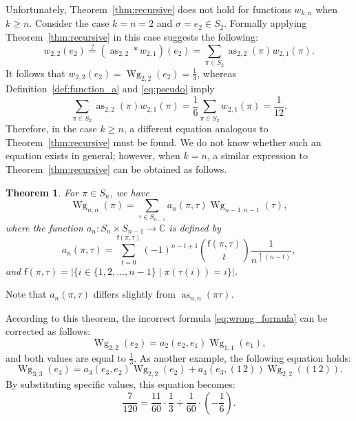 \documentclass[10pt,a4paper]{amsart}
\numberwithin{equation}{section}
\newtheorem{Theorem}{Theorem}[section]
\theoremstyle{definition}
\newcommand{\fix}[1]{\mathsf{f}(#1)}
\DeclareMathOperator{\Raise}{as}
\DeclareMathOperator{\Wg}{Wg}
\begin{document}
Unfortunately, Theorem~\ref{thm:recursive} does not hold for functions $w_{k,n}$ when $k \ge n$.
Consider the case $k=n=2$ and $\sigma =e_2 \in S_2$.
Formally applying Theorem~\ref{thm:recursive} in this case suggests the following:
\begin{equation} \label{eq:wrong_formula}
w_{2,2}(e_2) \stackrel{?}{=} (\Raise_{2,2} * w_{2,1})(e_2) = \sum_{\pi \in S_2} \Raise_{2,2}(\pi) w_{2,1}(\pi).
\end{equation}
It follows that $w_{2,2}(e_2)=\Wg_{2,2}(e_2)= \frac{1}{3}$,
whereas
Definition~\ref{def:function_a} and \eqref{eq:pseudo} imply
\[
\sum_{\pi \in S_2} \Raise_{2,2}(\pi) w_{2,1}(\pi)= \frac{1}{6}
\sum_{\pi \in S_2} w_{2,1}(\pi)= \frac{1}{12}.
\]
Therefore, in the case $k \ge n$, a different equation analogous to Theorem~\ref{thm:recursive} must be found.
We do not know whether such an equation exists in general; however, when $k=n$,
a similar expression to Theorem~\ref{thm:recursive} can be obtained as follows.

\begin{Theorem} \label{thm:dim_equal_degree}
For $\pi \in S_n$, we have
\[
\Wg_{n,n}(\pi)= \sum_{\tau \in S_{n-1}}
a_n(\pi, \tau) \Wg_{n-1,n-1}(\tau),
\]
where the function $a_n\colon S_n \times S_{n-1} \to \mathbb{C}$ is defined by
\begin{equation} \label{eq:def_new_a}
a_n(\pi, \tau)= \sum_{t=0}^{\fix{\pi, \tau}} (-1)^{n-t+1}
\binom{\fix{\pi, \tau}}{t} \frac{1}{n^{\uparrow (n-t)}},
\end{equation}
and $\fix{\pi,\tau}= |\{i \in \{1,2,\dots, n-1\} \mid
\pi (\tau(i))=i \}|$.
\end{Theorem}

Note that $a_n(\pi, \tau)$ differs slightly from $\Raise_{n,n}(\pi \tau)$.

According to this theorem, the incorrect formula \eqref{eq:wrong_formula} can be corrected as follows:
\[
\Wg_{2,2}(e_2)=a_2(e_2,e_1) \Wg_{1,1}(e_1),
\]
and both values are equal to $\frac{1}{3}$.
As another example, the following equation holds:
\[
\Wg_{3,3}(e_3)= a_3(e_3, e_2) \Wg_{2,2}(e_2)+
a_3(e_3, (1 \, 2)) \Wg_{2,2}
((1 \, 2)).
\]
By substituting specific values, this equation becomes:
\[
\frac{7}{120}= \frac{11}{60} \cdot \frac{1}{3} + \frac{1}{60} \cdot \left(- \frac{1}{6}\right).
\]
\end{document}
